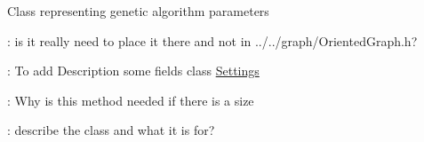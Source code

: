 \begin{DoxyRefList}
Class representing genetic algorithm parameters  
\item[Class \mbox{\hyperlink{classOrientedGraphParameters}{Oriented\+Graph\+Parameters}} ]\label{todo__todo000015}%
%
\+: is it really need to place it there and not in ../../graph/\+Oriented\+Graph.h?  
\item[Class \mbox{\hyperlink{classSettings}{Settings}} ]\label{todo__todo000017}%
%
\+: To add Description some fields class \mbox{\hyperlink{classSettings}{Settings}} 
\item[Member \mbox{\hyperlink{classTruthTable_a382ca1e1b9c12c2489c04f126631838c}{Truth\+Table\+::get\+Out\+Table}} (int i, int j) const]\label{todo__todo000001}%
%
  
\item[Member \mbox{\hyperlink{classTruthTableParameters_a85431954023d8b179833f24dece2bb10}{Truth\+Table\+Parameters\+::get\+Population\+Size}} ()]\label{todo__todo000016}%
%
\+: Why is this method needed if there is a size  
\item[Class \mbox{\hyperlink{classzhegalkinFromTruthTableParameters}{zhegalkin\+From\+Truth\+Table\+Parameters}} ]\label{todo__todo000008}%
%
\+: describe the class and what it is for? 
\end{DoxyRefList}